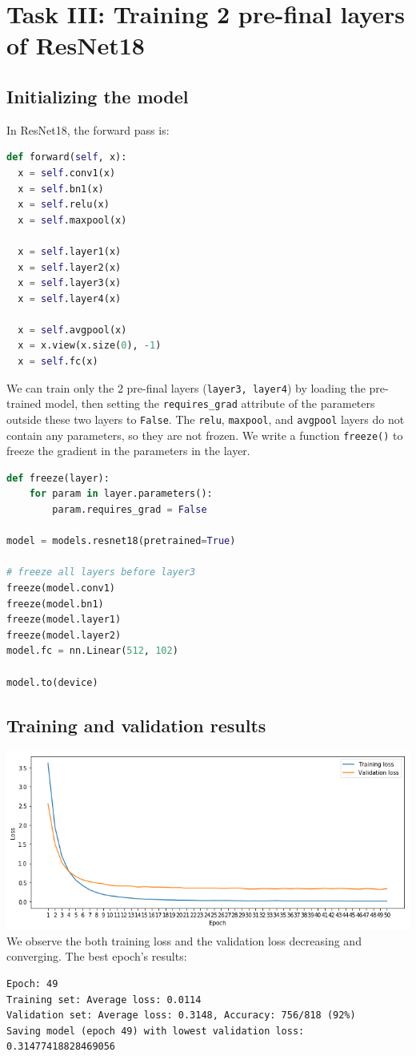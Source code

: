 \documentclass[twocolumn,9pt]{article}
\begin{document}
\section{Task III: Training 2 pre-final layers of ResNet18}
\subsection*{Initializing the model}
In ResNet18, the forward pass is:
\begin{lstlisting}[language=Python]
def forward(self, x):
  x = self.conv1(x)
  x = self.bn1(x)
  x = self.relu(x)
  x = self.maxpool(x)

  x = self.layer1(x)
  x = self.layer2(x)
  x = self.layer3(x)
  x = self.layer4(x)

  x = self.avgpool(x)
  x = x.view(x.size(0), -1)
  x = self.fc(x)
\end{lstlisting}

We can train only the 2 pre-final layers (\lstinline{layer3, layer4}) by loading the pre-trained model, then setting the \lstinline{requires_grad} attribute of the parameters outside these two layers to \lstinline{False}. The \lstinline{relu}, \lstinline{maxpool}, and \lstinline{avgpool} layers do not contain any parameters, so they are not frozen. We write a function \lstinline{freeze()} to freeze the gradient in the parameters in the layer.

\begin{lstlisting}[language=Python]
def freeze(layer):
    for param in layer.parameters():
        param.requires_grad = False

model = models.resnet18(pretrained=True)

# freeze all layers before layer3
freeze(model.conv1)
freeze(model.bn1)
freeze(model.layer1)
freeze(model.layer2)
model.fc = nn.Linear(512, 102)

model.to(device)
\end{lstlisting}

\subsection*{Training and validation results}
\includegraphics[width=\columnwidth]{task3.png}
We observe the both training loss and the validation loss decreasing and converging. The best
epoch's results:
\begin{lstlisting}
Epoch: 49
Training set: Average loss: 0.0114
Validation set: Average loss: 0.3148, Accuracy: 756/818 (92%)
Saving model (epoch 49) with lowest validation loss: 0.31477418828469056
\end{lstlisting}
\end{document}
